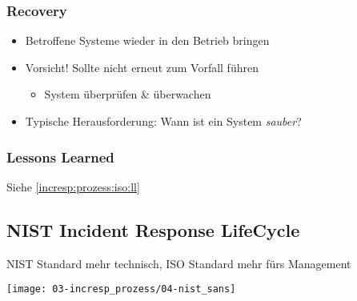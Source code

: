 \subsubsection{Recovery}
\begin{itemize}
    \item Betroffene Systeme wieder in den Betrieb bringen
    \item Vorsicht! Sollte nicht erneut zum Vorfall führen
    \begin{itemize}
        \item System überprüfen \& überwachen
    \end{itemize}
    \item Typische Herausforderung: Wann ist ein System \textit{sauber}?
\end{itemize}

\subsubsection{Lessons Learned}
Siehe \ref{incresp:prozess:iso:ll}

\subsection{NIST Incident Response LifeCycle}

NIST Standard mehr technisch, ISO Standard mehr fürs Management

\begin{center}
    \texttt{[image: 03-incresp\_prozess/04-nist\_sans]}
\end{center}


